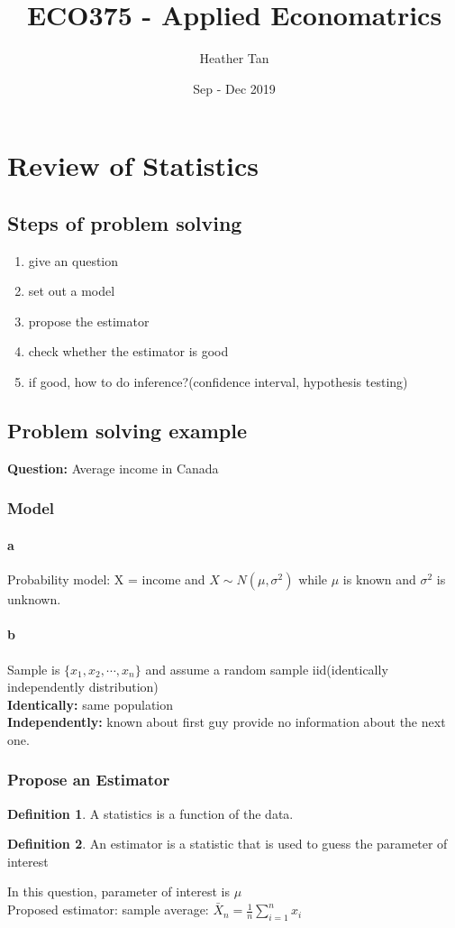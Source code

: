 \documentclass{article}
\title{ECO375 - Applied Economatrics}
\author{Heather Tan}
\date{Sep - Dec 2019}
\theoremstyle{definition}
\newtheorem{definition}{Definition}[section]
\theoremstyle{thrm}
\theoremstyle{lma}
\theoremstyle{ppst}
\theoremstyle{crlr}
\begin{document}
\maketitle	
\tableofcontents
\pagebreak

\section{Review of Statistics}
\subsection{Steps of problem solving}
\begin{enumerate}
	\item give an question
	\item set out a model
	\item propose the estimator
	\item check whether the estimator is good
	\item if good, how to do inference?(confidence interval, hypothesis testing)
\end{enumerate}
\subsection{Problem solving example}
\textbf{Question: } Average income in Canada
\subsubsection{Model}
\paragraph{a} Probability model: X = income and $X\sim N(\mu,\sigma^2)$ while $\mu $ is known and $\sigma^2$ is unknown. 
\paragraph{b} Sample is $\{x_1,x_2,\cdots, x_n\}$ and assume a random sample iid(identically independently distribution)\\
	\textbf{Identically:} same population\\
	\textbf{Independently: } known about first guy provide no information about the next one.
\subsubsection{Propose an Estimator}
\begin{definition}
	A statistics is a function of the data.
\end{definition}	
\begin{definition}
	An estimator is a statistic that is used to guess the parameter of interest
\end{definition}
In this question, parameter of interest is $\mu$\\
Proposed estimator: sample average: $\bar{X}_n = \frac{1}{n}\sum_{i=1}^nx_i$
\end{document}

